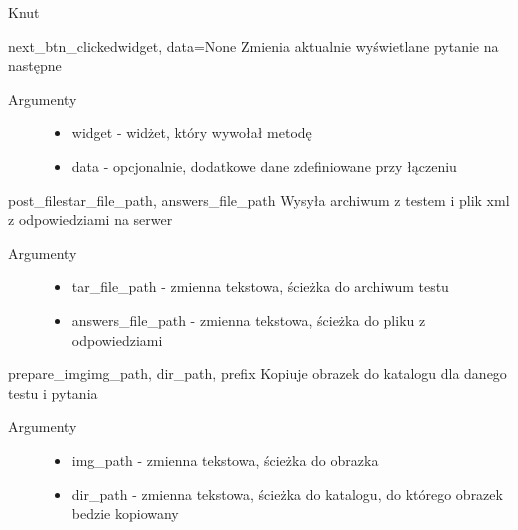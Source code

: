 \documentclass[letterpaper,10pt,polish]{manual}
\begin{document}
\begin{classdesc}{Knut}{}
\hypertarget{Knut.Knut.next\_btn\_clicked}{}\begin{methoddesc}{next\_btn\_clicked}{widget, data=None}
Zmienia aktualnie wyświetlane pytanie na następne
\begin{description}
\item[Argumenty] \leavevmode\begin{itemize}
\item {} 
widget - widżet, który wywołał metodę

\item {} 
data - opcjonalnie, dodatkowe dane zdefiniowane przy łączeniu

\end{itemize}

\end{description}
\end{methoddesc}

\hypertarget{Knut.Knut.post\_files}{}\begin{methoddesc}{post\_files}{tar\_file\_path, answers\_file\_path}
Wysyła archiwum z testem i plik xml z odpowiedziami na serwer
\begin{description}
\item[Argumenty] \leavevmode\begin{itemize}
\item {} 
tar\_file\_path - zmienna tekstowa, ścieżka do archiwum testu

\item {} 
answers\_file\_path - zmienna tekstowa, ścieżka do pliku z odpowiedziami

\end{itemize}

\end{description}
\end{methoddesc}

\hypertarget{Knut.Knut.prepare\_img}{}\begin{methoddesc}{prepare\_img}{img\_path, dir\_path, prefix}
Kopiuje obrazek do katalogu dla danego testu i pytania
\begin{description}
\item[Argumenty] \leavevmode\begin{itemize}
\item {} 
img\_path - zmienna tekstowa, ścieżka do obrazka

\item {} 
dir\_path - zmienna tekstowa, ścieżka do katalogu, do którego obrazek bedzie kopiowany


\end{itemize}
\end{description}
\end{methoddesc}
\end{classdesc}
\end{document}
